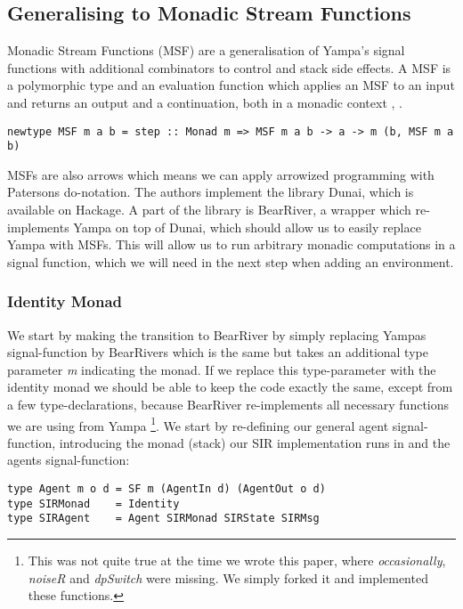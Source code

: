 \subsection{Generalising to Monadic Stream Functions}
Monadic Stream Functions (MSF) are a generalisation of Yampa's signal functions with additional combinators to control and stack side effects. A MSF is a polymorphic type and an evaluation function which applies an MSF to an input and returns an output and a continuation, both in a monadic context \cite{perez_functional_2016}, \cite{perez_extensible_2017}.
\begin{verbatim}
newtype MSF m a b = step :: Monad m => MSF m a b -> a -> m (b, MSF m a b)
\end{verbatim}

MSFs are also arrows which means we can apply arrowized programming with Patersons do-notation. The authors \cite{perez_functional_2016} implement the library Dunai, which is available on Hackage. A part of the library is BearRiver, a wrapper which re-implements Yampa on top of Dunai, which should allow us to easily replace Yampa with MSFs. This will allow us to run arbitrary monadic computations in a signal function, which we will need in the next step when adding an environment.

\subsubsection{Identity Monad}
We start by making the transition to BearRiver by simply replacing Yampas signal-function by BearRivers which is the same but takes an additional type parameter \textit{m} indicating the monad. If we replace this type-parameter with the identity monad we should be able to keep the code exactly the same, except from a few type-declarations, because BearRiver re-implements all necessary functions we are using from Yampa \footnote{This was not quite true at the time we wrote this paper, where \textit{occasionally}, \textit{noiseR} and \textit{dpSwitch} were missing. We simply forked it and implemented these functions.}.
We start by re-defining our general agent signal-function, introducing the monad (stack) our SIR implementation runs in and the agents signal-function:

\begin{verbatim}
type Agent m o d = SF m (AgentIn d) (AgentOut o d)
type SIRMonad    = Identity
type SIRAgent    = Agent SIRMonad SIRState SIRMsg
\end{verbatim}

